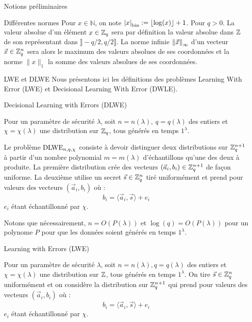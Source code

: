 \begin{section}{Notions préliminaires}
	\begin{subsection}{Différentes normes}
Pour $x\in \mathbb{N}$, on note ${|x|}_{\text{bin}} := \lfloor \log(x) \rfloor + 1$.
Pour $q > 0$. La valeur absolue d'un élément $x \in \mathbb{Z}_q$
sera par définition la valeur absolue dans $\mathbb{Z}$ de son représentant dans
$\rrbracket - q/2, q/2 \rrbracket$. 
	La norme infinie ${\|\vec{x}\|}_{\infty}$ d'un vecteur $\vec{x} \in \mathbb{Z}_q^n$ sera 
alors le maximum des valeurs absolues de ses coordonnées et la norme
$\|x\|_{1}$ la somme des valeurs absolues de ses coordonnées.

	\end{subsection}
	\begin{subsection}{LWE et DLWE}
	Nous présentons ici les définitions des problèmes Learning With Error (LWE) et Decisional Learning 
	With Error (DWLE).
	
	\begin{definition}{Decisional Learning with Errors (DLWE)}

	Pour un paramètre de sécurité $\lambda$, soit $n = n(\lambda),\ q = q(\lambda)$ des entiers et $\chi =
	\chi(\lambda)$ une distribution sur $\mathbb{Z}_q$, tous générés en temps $1^\lambda$.
	
	Le problème $\text{DLWE}_{n,q,\chi}$ consiste à devoir distinguer deux distributions sur $\mathbb{Z}_q^{n+1}$ à partir d'un nombre
	polynomial $m = m(\lambda)$ d'échantillons qu'une des deux à produite. La première distribution crée des
	vecteurs $(\vec{a}_i,b_i) \in \mathbb{Z}_q^{n+1}$ de façon uniforme. La deuxième utilise un secret $\vec{s} \in \mathbb{Z}_q^n$
	tiré uniformément et prend pour valeurs des vecteurs $(\vec{a}_i, b_i)$ où : 
	\[ b_i = \langle \vec{a}_i, \vec{s} \rangle + e_i \] 
	$e_i$ étant échantillonné par $\chi$.
	\end{definition}
	Notons que nécessairement, $n = O(P(\lambda))\text{ et }\log(q) = O(P(\lambda))$ pour un polynome $P$ pour que
	les données soient générés en temps $1^\lambda$.

	\begin{definition}{Learning with Errors (LWE)}
	
	Pour un paramètre de sécurité $\lambda$, soit $n = n(\lambda),q = q(\lambda)$ des entiers et $\chi =
	\chi(\lambda)$ une distribution sur $\mathbb{Z}$, tous générés en temps $1^\lambda$.  
	On tire $\vec{s} \in \mathbb{Z}_q^n$ uniformément et on considère la distribution sur $\mathbb{Z}_q^{n+1}$ qui prend pour valeurs des vecteurs
	$(\vec{a}_i, b_i)$ où : \[ b_i = \langle \vec{a}_i, \vec{s} \rangle + e_i \] $e_i$ étant échantillonné par
	$\chi$.


\end{definition}
\end{subsection}
\end{section}
